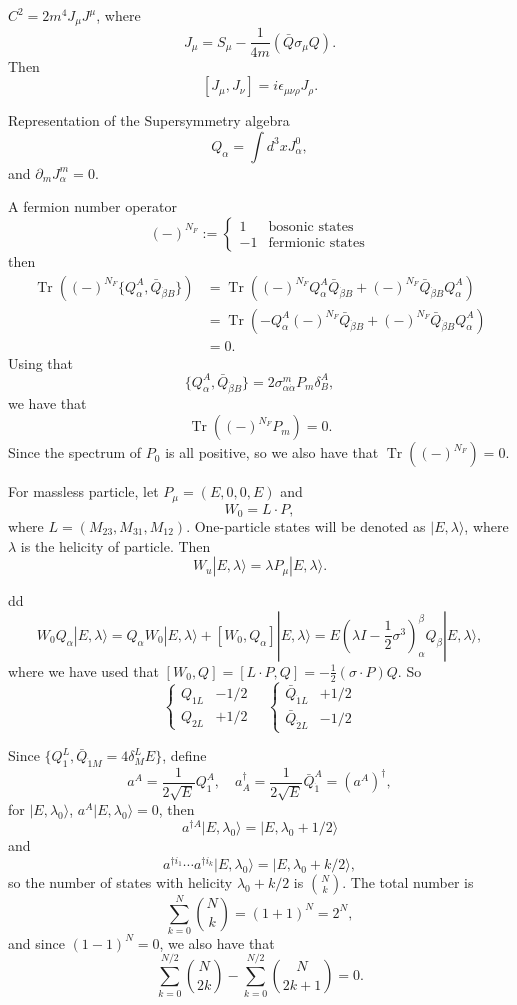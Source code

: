 \documentclass[11pt]{article}
\theoremstyle{definition}
\theoremstyle{plain}
\begin{document}
$C^2=2m^4J_\mu J^\mu$, where 
\[
	J_\mu=S_\mu-\frac 1{4m}(\bar Q\sigma_\mu Q).
\]
Then
\[
	[J_\mu,J_\nu]=i\epsilon_{\mu\nu\rho}J_\rho.
\]

Representation of the Supersymmetry algebra
\[
	Q_\alpha=\int d^3x J_\alpha^0,
\]
and $\partial_mJ^m_\alpha=0$.

A fermion number operator 
\[
	(-)^{N_F}:=\begin{cases}
	1&\text{bosonic states}\\
	-1&\text{fermionic states}
	\end{cases}
\]
then
\begin{align*}
\operatorname{Tr}\left((-)^{N_F}\{Q_\alpha^A,\bar Q_{\dot \beta B}\}\right)&=\operatorname{Tr}\left((-)^{N_F}Q_\alpha^A\bar Q_{\dot \beta B}+(-)^{N_F}\bar Q_{\dot \beta B}Q_\alpha^A\right)\\
&=\operatorname{Tr}\left(-Q_\alpha^A(-)^{N_F}\bar Q_{\dot \beta B}+(-)^{N_F}\bar Q_{\dot \beta B}Q_\alpha^A\right)\\
&=0.
\end{align*}
Using that 
\[
	\{Q_\alpha^A,\bar Q_{\dot \beta B}\}=2\sigma^m_{\alpha\dot\alpha}P_m \delta^A_B,
\]
we have that
\[
	\operatorname{Tr}\left((-)^{N_F}P_m\right)=0.
\]
Since the spectrum of $P_0$ is all positive, so we also have that $\operatorname{Tr}\left((-)^{N_F}\right)=0$.

For massless particle, let $P_\mu=(E,0,0,E)$ and 
\[
	W_0=L\cdot P,
\]
where $L=(M_{23},M_{31},M_{12})$. One-particle states will be denoted
as $|E,\lambda\rangle$, where $\lambda$ is the helicity of particle. 
Then 
\[
	W_u|E,\lambda\rangle =\lambda P_\mu |E,\lambda\rangle.
\]

dd
\[
	W_0Q_\alpha|E,\lambda\rangle=Q_\alpha W_0|E,\lambda\rangle+[W_0,Q_\alpha]|E,\lambda\rangle=E\left(\lambda I-\frac 12 \sigma^3\right)^{\beta}_\alpha Q_\beta |E,\lambda\rangle,
\]
where we have used that $[W_0,Q]=[L\cdot P,Q]=-\frac 12(\sigma\cdot P) Q$.
So
\[
	\begin{cases}
	Q_{1L}& -1/2\\
	Q_{2L}& +1/2
	\end{cases}
	\quad 
	\begin{cases}
	\bar Q_{\dot 1L}& +1/2\\
	\bar Q_{\dot 2L}& -1/2
	\end{cases}
\]

Since $\{Q_1^L,\bar Q_{\dot 1 M}=4\delta^L_M E\}$, define
\[
	a^A=\frac{1}{2\sqrt E}Q_1^A,\quad a^\dagger_A=
	\frac{1}{2\sqrt E}\bar Q_{\dot 1}^A=(a^A)^\dagger,
\]
for $|E,\lambda_0\rangle$, $a^A|E,\lambda_0\rangle=0$, then
\[
	a^{\dagger A}|E,\lambda_0\rangle=|E,\lambda_0+1/2\rangle
\]
and
\[
a^{\dagger i_1}\cdots a^{\dagger i_k}|E,\lambda_0\rangle=
|E,\lambda_0+k/2\rangle,
\]
so the number of states with helicity $\lambda_0+k/2$ is $\binom{N}{k}$. 
The total number is 
\[
	\sum_{k=0}^N \binom{N}{k}=(1+1)^N=2^N,
\]
and since $(1-1)^N=0$, we also have that
\[
	\sum_{k=0}^{N/2} \binom{N}{2k}-\sum_{k=0}^{N/2} \binom{N}{2k+1}=0.
\]
\end{document}
